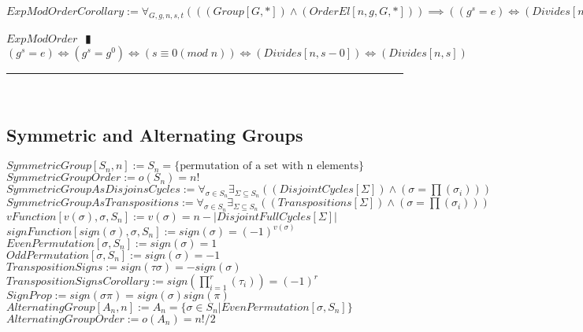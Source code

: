 \documentclass{book}
\newcommand{\abr}{:=}
\newcommand{\pipe}{$\phantom{(}\vrectangleblack\phantom{)}$}
\newcommand{\pr}[1]{\left(#1\right)}
\begin{document}
$ExpModOrderCorollary \abr \forall_{G, g, n, s, t}\pr{\pr{(Group[G, *]) \land (OrderEl[n, g, G, *])} \implies \pr{(g^s = e) \iff (Divides[n, s])}}$
\begin{enumerate}
  \lit $ExpModOrder$ \pipe $(g^s = e) \iff (g^s = g^0) \iff \pr{s \equiv 0 (mod \phantom{.} n)} \iff (Divides[n, s - 0]) \iff (Divides[n, s])$
\end{enumerate} \vspace{.75mm} \hrule \vspace{.75mm} \ \\ 


\subsection{Symmetric and Alternating Groups}
$SymmetricGroup[S_n, n] \abr S_n = \{\text{permutation of a set with n elements}\}$ \\
$SymmetricGroupOrder \abr o(S_n) = n!$ \\
$SymmetricGroupAsDisjoinsCycles \abr \forall_{\sigma \in S_n} \exists_{\Sigma \subseteq S_n}\pr{(DisjointCycles[\Sigma]) \land \pr{\sigma = \prod(\sigma_i)}}$ \\
$SymmetricGroupAsTranspositions \abr \forall_{\sigma \in S_n} \exists_{\Sigma \subseteq S_n}\pr{(Transpositions[\Sigma]) \land \pr{\sigma = \prod(\sigma_i)}}$ \\

$vFunction[v(\sigma), \sigma, S_n] \abr v(\sigma) = n - |DisjointFullCycles[\Sigma]|$ \\
$signFunction[sign(\sigma), \sigma, S_n] \abr sign(\sigma) = (-1)^{v(\sigma)}$ \\
$EvenPermutation[\sigma, S_n] \abr sign(\sigma) = 1$ \\
$OddPermutation[\sigma, S_n] \abr sign(\sigma) = -1$ \\

$TranspositionSigns \abr sign(\tau \sigma) = -sign(\sigma)$ \\
$TranspositionSignsCorollary \abr sign\pr{\prod_{i = 1}^{r}(\tau_i)} = (-1)^r$ \\
$SignProp \abr sign(\sigma \pi) = sign(\sigma) sign(\pi)$ \\

$AlternatingGroup[A_n, n] \abr A_n = \{\sigma \in S_n | EvenPermutation[\sigma, S_n]\}$ \\
$AlternatingGroupOrder \abr o(A_n) = n!/2$ \\
\end{document}
